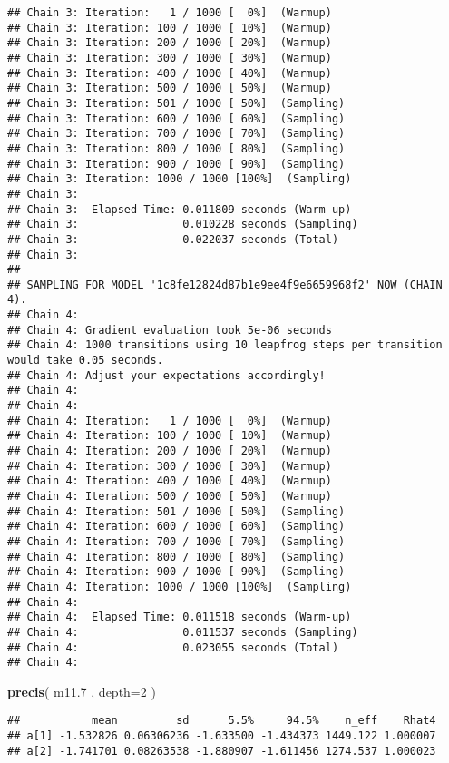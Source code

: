 \documentclass[]{article}
\newenvironment{Shaded}{\begin{snugshade}}{\end{snugshade}}
\newcommand{\KeywordTok}[1]{\textcolor[rgb]{0.13,0.29,0.53}{\textbf{{#1}}}}
\newcommand{\DataTypeTok}[1]{\textcolor[rgb]{0.13,0.29,0.53}{{#1}}}
\newcommand{\DecValTok}[1]{\textcolor[rgb]{0.00,0.00,0.81}{{#1}}}
\newcommand{\FloatTok}[1]{\textcolor[rgb]{0.00,0.00,0.81}{{#1}}}
\newcommand{\NormalTok}[1]{{#1}}
\begin{document}
\begin{verbatim}
## Chain 3: Iteration:   1 / 1000 [  0%]  (Warmup)
## Chain 3: Iteration: 100 / 1000 [ 10%]  (Warmup)
## Chain 3: Iteration: 200 / 1000 [ 20%]  (Warmup)
## Chain 3: Iteration: 300 / 1000 [ 30%]  (Warmup)
## Chain 3: Iteration: 400 / 1000 [ 40%]  (Warmup)
## Chain 3: Iteration: 500 / 1000 [ 50%]  (Warmup)
## Chain 3: Iteration: 501 / 1000 [ 50%]  (Sampling)
## Chain 3: Iteration: 600 / 1000 [ 60%]  (Sampling)
## Chain 3: Iteration: 700 / 1000 [ 70%]  (Sampling)
## Chain 3: Iteration: 800 / 1000 [ 80%]  (Sampling)
## Chain 3: Iteration: 900 / 1000 [ 90%]  (Sampling)
## Chain 3: Iteration: 1000 / 1000 [100%]  (Sampling)
## Chain 3: 
## Chain 3:  Elapsed Time: 0.011809 seconds (Warm-up)
## Chain 3:                0.010228 seconds (Sampling)
## Chain 3:                0.022037 seconds (Total)
## Chain 3: 
## 
## SAMPLING FOR MODEL '1c8fe12824d87b1e9ee4f9e6659968f2' NOW (CHAIN 4).
## Chain 4: 
## Chain 4: Gradient evaluation took 5e-06 seconds
## Chain 4: 1000 transitions using 10 leapfrog steps per transition would take 0.05 seconds.
## Chain 4: Adjust your expectations accordingly!
## Chain 4: 
## Chain 4: 
## Chain 4: Iteration:   1 / 1000 [  0%]  (Warmup)
## Chain 4: Iteration: 100 / 1000 [ 10%]  (Warmup)
## Chain 4: Iteration: 200 / 1000 [ 20%]  (Warmup)
## Chain 4: Iteration: 300 / 1000 [ 30%]  (Warmup)
## Chain 4: Iteration: 400 / 1000 [ 40%]  (Warmup)
## Chain 4: Iteration: 500 / 1000 [ 50%]  (Warmup)
## Chain 4: Iteration: 501 / 1000 [ 50%]  (Sampling)
## Chain 4: Iteration: 600 / 1000 [ 60%]  (Sampling)
## Chain 4: Iteration: 700 / 1000 [ 70%]  (Sampling)
## Chain 4: Iteration: 800 / 1000 [ 80%]  (Sampling)
## Chain 4: Iteration: 900 / 1000 [ 90%]  (Sampling)
## Chain 4: Iteration: 1000 / 1000 [100%]  (Sampling)
## Chain 4: 
## Chain 4:  Elapsed Time: 0.011518 seconds (Warm-up)
## Chain 4:                0.011537 seconds (Sampling)
## Chain 4:                0.023055 seconds (Total)
## Chain 4:
\end{verbatim}

\begin{Shaded}
\begin{Highlighting}[]
\KeywordTok{precis}\NormalTok{( m11}\FloatTok{.7} \NormalTok{, }\DataTypeTok{depth=}\DecValTok{2} \NormalTok{)}
\end{Highlighting}
\end{Shaded}

\begin{verbatim}
##           mean         sd      5.5%     94.5%    n_eff    Rhat4
## a[1] -1.532826 0.06306236 -1.633500 -1.434373 1449.122 1.000007
## a[2] -1.741701 0.08263538 -1.880907 -1.611456 1274.537 1.000023
\end{verbatim}
\end{document}
